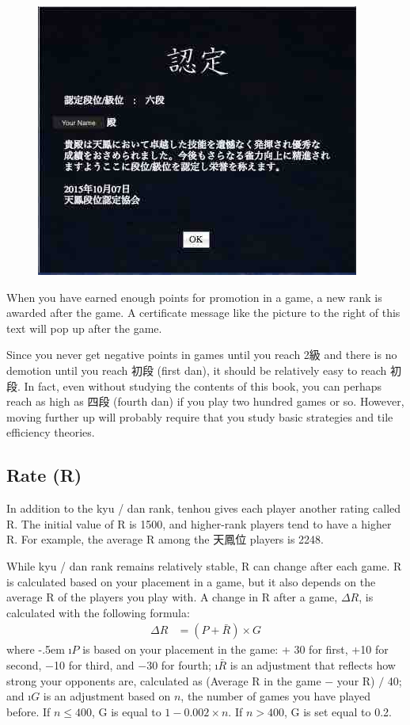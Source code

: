 \bigskip
\begin{figure}
\vspace{-30pt}
\begin{center}
\includegraphics[width=.45\textwidth,clip]{figs/6dan.jpg}
\end{center}
\vspace{-25pt}
\end{figure}
When you have earned enough points for promotion in a game, a new rank is awarded after the game. A certificate message like the picture to the right of this text will pop up after the game. 

\bigskip
Since you never get negative points in games until you reach 2級 and there is no demotion until you reach 初段 (first {\jap dan}), it should be relatively easy to reach 初段. In fact, even without studying the contents of this book, you can perhaps reach as high as 四段 (fourth {\jap dan}) if you play two hundred games or so. However, moving further up will probably require that you study basic strategies and tile efficiency theories. 

\subsection{Rate (R)}

In addition to the {\jap kyu / dan} rank, {\jap tenhou} gives each player another rating called R. The initial value of R is 1500, and higher-rank players tend to have a higher R. For example, the average R among the 天鳳位 players is 2248.%

\bigskip
While {\jap kyu / dan} rank remains relatively stable, R can change after each game. R is calculated based on your placement in a game, but it also depends on the average R of the players you play with. 
A change in R after a game, $\Delta R$, is calculated with the following formula:
\begin{align*}
\Delta R &= (P + \bar{R}) \times G
\end{align*}
where 
\bi \itemsep-.5em
\i $P$ is based on your placement in the game: + 30 for first, +10 for second, $-$10 for third, and $-$30 for fourth;
\i $\bar{R}$ is an adjustment that reflects how strong your opponents are, calculated as (Average R in the game $-$ your R) $/$ 40; and
\i $G$ is an adjustment based on $n$, the number of games you have played before. If $n \leq 400$, G is equal to $1-0.002 \times n$. If $n > 400$, G is set equal to 0.2.
\ei

